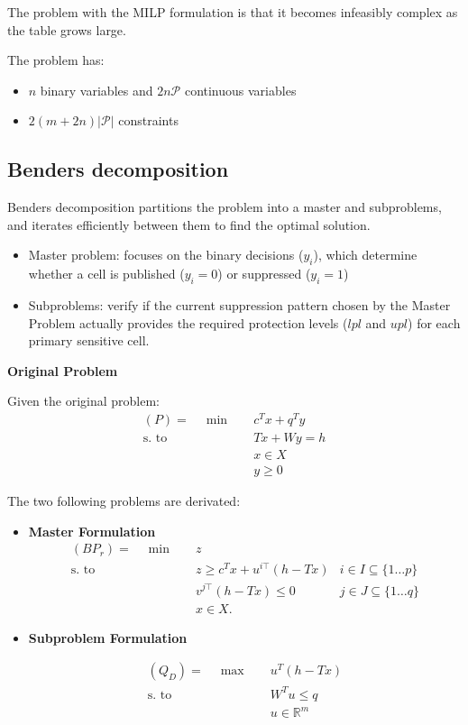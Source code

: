 \documentclass[11pt,a4paper]{article}
\begin{document}
The problem with the MILP formulation is that it becomes infeasibly complex as the table grows large.

The problem has:
\begin{itemize}
  \item $n$ binary variables and $2n\mathcal{P}$ continuous variables
  \item $2(m+2n)|\mathcal{P}|$ constraints
\end{itemize}

\subsection{Benders decomposition} \label{sec:benders-decomposition-formulation}

Benders decomposition partitions the problem into a master and subproblems, and
iterates efficiently between them to find the optimal solution.
\begin{itemize}
  \item Master problem: focuses on the binary decisions ($y_i$), which determine whether a cell is published ($y_i=0$) or suppressed ($y_i=1$)
  \item Subproblems: verify if the current suppression pattern chosen by the Master Problem actually provides the required protection levels ($lpl$ and $upl$) for each primary sensitive cell.
\end{itemize}

\textbf{Original Problem}

Given the original problem: 
\begin{align*} 
(P) = \quad \min \quad & c^T x + q^T y \\
\text{s. to} \quad & Tx + Wy = h \\
& x \in X \\
& y \geq 0
\end{align*}    


The two following problems are derivated:
\begin{itemize}
  \item \textbf{Master Formulation}
  \begin{align*}
  (BP_r) = \quad \min \quad & z \\
  \text{s. to} \quad & z \geq c^T x + u^{i\top} (h - Tx) &  i \in I \subseteq \{1 \dots p\} \\
  & v^{j\top} (h - Tx) \leq 0 & j \in J \subseteq \{1 \dots q\} \\
  & x \in X.
  \end{align*}
  \item \textbf{Subproblem Formulation}

    \begin{align*}
  (Q_D) = \quad \max \quad & u^T(h - Tx) \\
  \text{s. to} \quad & W^T u \leq q \\
  & u \in \mathbb{R}^m
  \end{align*}
\end{itemize}
\end{document}
